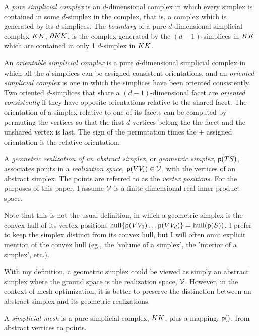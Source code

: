 A {\it pure simplicial complex} is an $d$-dimensional complex
in which every simplex is contained in some $d$-simplex in the complex,
that is, a complex which is generated by its $d$-simplices.
The {\it boundary} of a pure $d$-dimensional simplicial complex $K{K}$,
$\partial K{K}$,
is the complex generated by the $(d-1)$-simplices in $K{K}$
which are contained in only 1 $d$-simplex in $K{K}$.

An {\it orientable simplicial complex} is a pure $d$-dimensional simplicial complex
in which all the $d$-simplices can be assigned consistent orientations,
and an {\it oriented simplicial complex} is one in which the simplices
have been oriented consistently.
Two oriented $d$-simplices that share a $(d-1)$-dimensional facet
are {\it oriented consistently} if they have opposite orientations
relative to the shared facet. The orientation of a simplex relative to
one of its facets can be computed by permuting the vertices so that
the first $d$ vertices belong the the facet and the unshared vertex is last.
The sign of the permutation times the $\pm$ assigned orientation
is the relative orientation.




A {\it geometric realization of an abstract simplex,}
or {\it geometric simplex}, $\mathsf{p}(T{S})$,  associates points
in a {\it realization space,}
$\mathsf{p} ( V{V}_i ) \in \mathcal{V}$, with the vertices of an abstract simplex.
The points are referred to as the {\it vertex positions.}
For the purposes of this paper,
I assume $\mathcal{V}$ is
a finite dimensional real inner product space.

Note that this is not the usual definition,
in which a geometric simplex is the convex hull of its vertex positions
$\mathrm{hull} \{ \mathsf{p}(V{V}_0) \ldots \mathsf{p}(V{V}_d) \} = \mathrm{hull} ( \mathsf{p}(S) )$.
I prefer to keep the simplex distinct from its convex hull,
but I will often omit explicit mention of the convex hull
(eg., the 'volume of a simplex', the 'interior of a simplex', etc.).

With my definition,
a geometric simplex could be viewed as simply an abstract simplex
where the ground space is the realization space, $\mathcal{V}$.
However, in the context of mesh optimization,
it is better to preserve the distinction between an abstract simplex
and its geometric realizations.

A {\it simplicial mesh} is a pure simplicial complex, $K{K}$,
plus a mapping, $\mathsf{p}()$, from abstract vertices to points.

